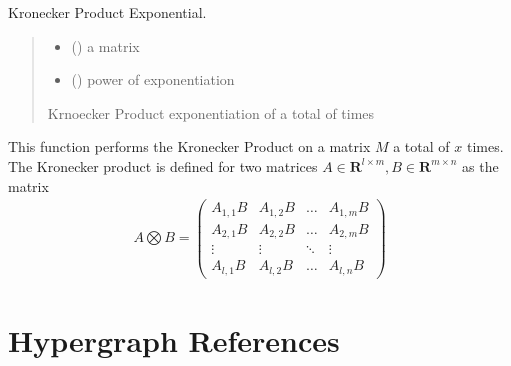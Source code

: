 \documentclass[letterpaper,10pt,english]{sphinxmanual}
\begin{document}
\begin{fulllineitems}
\label{\detokenize{HAT:HAT.multilinalg.kronExponentiation}}
\pysigstartsignatures
{}
\pysigstopsignatures
\sphinxAtStartPar
Kronecker Product Exponential.
\begin{quote}\begin{description}
\begin{itemize}
\item {} 
\sphinxAtStartPar
{} () \textendash{} a matrix

\item {} 
\sphinxAtStartPar
{} () \textendash{} power of exponentiation

\end{itemize}

\sphinxAtStartPar
Krnoecker Product exponentiation of  a total of  times

\sphinxAtStartPar
{}

\end{description}\end{quote}

\sphinxAtStartPar
This function performs the Kronecker Product on a matrix \(M\) a total of
\(x\) times. The Kronecker product is defined for two matrices
\(A\in\mathbf{R}^{l \times m}, B\in\mathbf{R}^{m \times n}\) as the matrix
\begin{equation*}
\begin{split}A \bigotimes B= \begin{pmatrix} A_{1,1}B & A_{1,2}B & \dots & A_{1,m}B \\ A_{2,1}B & A_{2,2}B & \dots & A_{2,m}B \\ \vdots & \vdots & \ddots & \vdots \\ A_{l,1}B & A_{l,2}B & \dots & A_{l,n}B \end{pmatrix}\end{split}
\end{equation*}
\end{fulllineitems}


\sphinxstepscope


\section{Hypergraph References}
\label{\detokenize{ref:hypergraph-references}}\label{\detokenize{ref::doc}}\begin{quote}
\end{quote}
\end{document}
